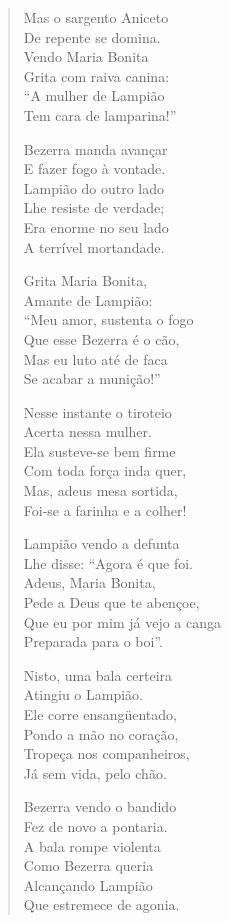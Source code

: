 \begin{verse}
Mas o sargento Aniceto\\
De repente se domina.\\
Vendo Maria Bonita\\
Grita com raiva canina:\\
“A mulher de Lampião\\
Tem cara de lamparina!”

Bezerra manda avançar\\
E fazer fogo à vontade.\\
Lampião do outro lado\\
Lhe resiste de verdade;\\
Era enorme no seu lado\\
A terrível mortandade.
\pagebreak

Grita Maria Bonita,\\
Amante de Lampião:\\
“Meu amor, sustenta o fogo\\
Que esse Bezerra é o cão,\\
Mas eu luto até de faca\\
Se acabar a munição!”

Nesse instante o tiroteio\\
Acerta nessa mulher.\\
Ela susteve-se bem firme\\
Com toda força inda quer,\\
Mas, adeus mesa sortida,\\
Foi-se a farinha e a colher!

Lampião vendo a defunta\\
Lhe disse: “Agora é que foi.\\
Adeus, Maria Bonita,\\
Pede a Deus que te abençoe,\\
Que eu por mim já vejo a canga\\
Preparada para o boi”.

Nisto, uma bala certeira\\
Atingiu o Lampião.\\
Ele corre ensangüentado,\\
Pondo a mão no coração,\\
Tropeça nos companheiros,\\
Já sem vida, pelo chão.
\pagebreak

Bezerra vendo o bandido\\
Fez de novo a pontaria.\\
A bala rompe violenta\\
Como Bezerra queria\\
Alcançando Lampião\\
Que estremece de agonia.


\end{verse}
